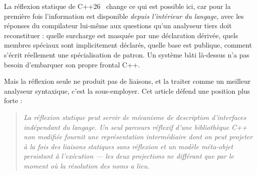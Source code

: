 \documentclass[11pt,a4paper]{article}
\begin{document}
La réflexion statique de C++26~\cite{p2996} change ce qui est possible ici, car
pour la première fois l'information est disponible \emph{depuis l'intérieur du
langage}, avec les réponses du compilateur lui-même aux questions qu'un
analyseur tiers doit reconstituer : quelle surcharge est masquée par une
déclaration dérivée, quels membres spéciaux sont implicitement déclarés, quelle
base est publique, comment s'écrit réellement une spécialisation de patron. Un
système bâti là-dessus n'a pas besoin d'embarquer son propre frontal C++.

Mais la réflexion seule ne produit pas de liaisons, et la traiter comme un
meilleur analyseur syntaxique, c'est la sous-employer. Cet article défend une
position plus forte :

\begin{quote}\itshape
La réflexion statique peut servir de mécanisme de description d'interfaces
indépendant du langage. Un seul parcours réflexif d'une bibliothèque C++ non
modifiée fournit une représentation intermédiaire dont on peut projeter
\emph{à la fois} des liaisons statiques sans réflexion \emph{et} un modèle
méta-objet persistant à l'exécution --- les deux projections ne différant que
par le moment où la résolution des noms a lieu.
\end{quote}
\end{document}
